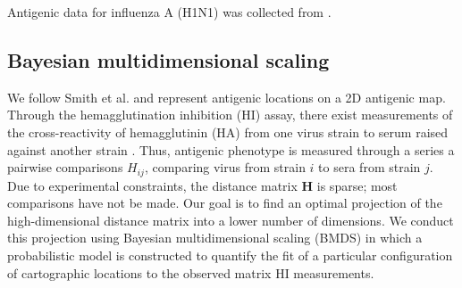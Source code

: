\documentclass[11pt,oneside,letterpaper]{article}
\begin{document}
Antigenic data for influenza A (H1N1) was collected from \cite{Faress05,Chakraverty82,Chakraverty86,Cox83,Daniels85,Daum02,Donatelli93,Kendal78,McDonald07,Nakajima79,Nakajima81,Pereira82,Stevens87,Webster79,Raymond86}.

\subsection*{Bayesian multidimensional scaling}

We follow Smith et al. \cite{Smith04} and represent antigenic locations on a 2D antigenic map. 
Through the hemagglutination inhibition (HI) assay, there exist measurements of the cross-reactivity of hemagglutinin (HA) from one virus strain to serum raised against another strain \cite{Hirst43}. 
Thus, antigenic phenotype is measured through a series a pairwise comparisons $H_{ij}$, comparing virus from strain $i$ to sera from strain $j$. 
Due to experimental constraints, the distance matrix $\mathbf{H}$ is sparse; most comparisons have not be made. 
Our goal is to find an optimal projection of the high-dimensional distance matrix into a lower number of dimensions. 
We conduct this projection using Bayesian multidimensional scaling (BMDS) \cite{Oh01} in which a probabilistic model is constructed to quantify the fit of a particular configuration of cartographic locations to the observed matrix HI measurements.
\end{document}
